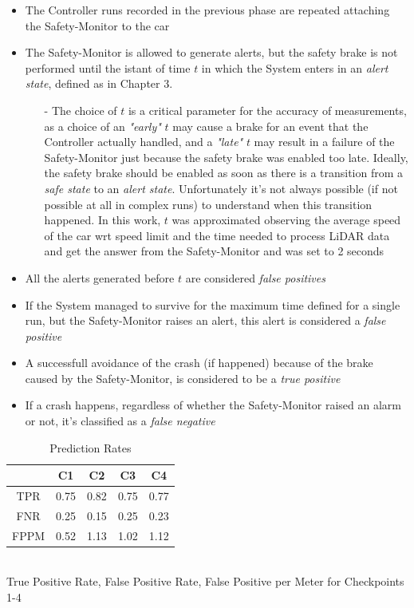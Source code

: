 \begin{itemize}
	\item The Controller runs recorded in the previous phase are repeated attaching the Safety-Monitor to the car
	\item The Safety-Monitor is allowed to generate alerts, but the safety brake is not performed until the istant of time $t$ in which the System enters in an \textsl{alert state}, defined as in Chapter 3.
	\begin{itemize}
		\item[-] The choice of $t$ is a critical parameter for the accuracy of measurements, as a choice of an \textsl{"early"} $t$ may cause a brake for an event that the Controller actually handled, and a \textsl{"late"} $t$ may result in a failure of the Safety-Monitor just because the safety brake was enabled too late. Ideally, the safety brake should be enabled as soon as there is a transition from a \textsl{safe state} to an \textsl{alert state}. Unfortunately it's not always possible (if not possible at all in complex runs) to understand when this transition happened. In this work, $t$ was approximated observing the average speed of the car wrt speed limit and the time needed to process LiDAR data and get the answer from the Safety-Monitor and was set to 2 seconds
	\end{itemize}
	\item All the alerts generated before $t$ are considered \textsl{false positives}
	\item If the System managed to survive for the maximum time defined for a single run, but the Safety-Monitor raises an alert, this alert is considered a \textsl{false positive}
	\item A successfull avoidance of the crash (if happened) because of the brake caused by the Safety-Monitor, is considered to be a \textsl{true positive}
	\item If a crash happens, regardless of whether the Safety-Monitor raised an alarm or not, it's classified as a \textsl{false negative}
\end{itemize}

\vspace{0.5cm}
\begin{table}[h]
	\caption{Prediction Rates}
	\begin{center}
		\begin{tabular}{ |c|c|c|c|c| }
			\hline
			  & C1 & C2 & C3 & C4 \\
			\hline
			TPR & 0.75 & 0.82 & 0.75 & 0.77 \\
			\hline
			FNR & 0.25 & 0.15 & 0.25 & 0.23 \\
			\hline
			FPPM & 0.52 & 1.13 & 1.02 & 1.12 \\
			\hline
		\end{tabular}
	\\
	\vspace{0.3cm}
	True Positive Rate, False Positive Rate, False Positive per Meter for Checkpoints 1-4
	\end{center}
\end{table}

